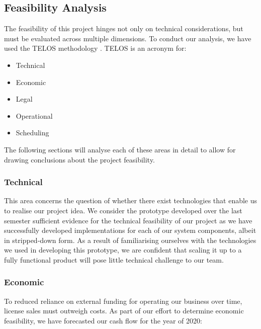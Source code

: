 \documentclass[main.tex]{subfiles}
\begin{document}
\subsection{Feasibility Analysis}
\label{Feasibility Analysis}

The feasibility of this project hinges not only on technical considerations, but must be evaluated across multiple dimensions. To conduct our analysis, we have used the TELOS methodology \cite{drljaca_latinovic_2018}. TELOS is an acronym for:

\begin{itemize}
    \item Technical
    \item Economic
    \item Legal
    \item Operational
    \item Scheduling
\end{itemize}

The following sections will analyse each of these areas in detail to allow for drawing conclusions about the project feasibility.

\subsubsection{Technical}

This area concerns the question of whether there exist technologies that enable us to realise our project idea. We consider the prototype developed over the last semester sufficient evidence for the technical feasibility of our project as we have successfully developed implementations for each of our system components, albeit in stripped-down form. As a result of familiarising ourselves with the technologies we used in developing this prototype, we are confident that scaling it up to a fully functional product will pose little technical challenge to our team.

\subsubsection{Economic}

To reduced reliance on external funding for operating our business over time, license sales must outweigh costs. As part of our effort to determine economic feasibility, we have forecasted our cash flow for the year of 2020:
\end{document}
